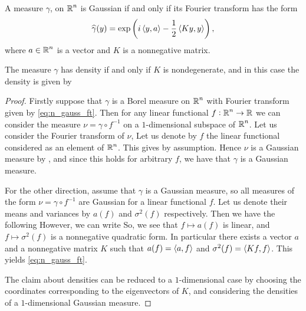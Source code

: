 \documentclass[../main.tex]{subfiles}
\begin{document}
\begin{proposition}
\label{prop:n_gauss_ft}
A measure $\gamma$, on $\operatorname{\mathbb{R}}^n$ is Gaussian if and only if its Fourier transform has the form 
\begin{equation}
    \label{eq:n_gauss_ft}
    \widehat{\gamma}(y) = \exp\left( i\left\langle y,a \right\rangle - \frac12\left\langle Ky,y \right\rangle \right),
\end{equation} 
where $a\in\operatorname{\mathbb{R}}^n$ is a vector and $K$ is a nonnegative matrix.

The measure $\gamma$ has density if and only if $K$ is nondegenerate, and in this case the density is given by 
\end{proposition}
\begin{proof}
Firstly suppose that $\gamma$ is a Borel measure on $\operatorname{\mathbb{R}}^n$ with Fourier transform given by \eqref{eq:n_gauss_ft}. Then for any linear functional $f:\operatorname{\mathbb{R}}^n\to\operatorname{\mathbb{R}}$ we can consider the measure $\nu = \gamma\circ f^{-1}$ on a $1$-dimensional subspace of $\operatorname{\mathbb{R}}^n$. Let us consider the Fourier transform of $\nu$,
 Let us denote by $f$ the linear functional considered as an element of $\operatorname{\mathbb{R}}^n$. This gives  by assumption. Hence $\nu$ is a Gaussian measure by , and since this holds for arbitrary $f$, we have that $\gamma$ is a Gaussian measure.

For the other direction, assume that $\gamma$ is a Gaussian measure, so all measures of the form $\nu = \gamma\circ f^{-1}$ are Gaussian for a linear functional $f$. Let us denote their means and variances by $a(f)$ and $\sigma^2(f)$ respectively. Then we have the following  However, we can write
 So, we see that $f\mapsto a(f)$ is linear, and $f\mapsto\sigma^2(f)$ is a nonnegative quadratic form. In particular there exists a vector $a$ and a nonnegative matrix $K$ such that $a(f) = \left\langle a,f \right\rangle$ and $\sigma^2(f) = \left\langle Kf,f \right\rangle$. This yields \eqref{eq:n_gauss_ft}.

The claim about densities can be reduced to a $1$-dimensional case by choosing the coordinates corresponding to the eigenvectors of $K$, and considering the densities of a $1$-dimensional Gaussian measure.
\end{proof}
\end{document}
